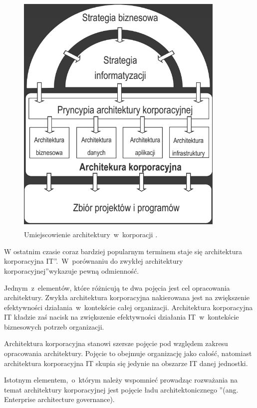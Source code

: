 \begin{figure}[h!tbp]
\begin{centering}
\includegraphics[width=10cm, height=12cm]{img/ea.png}
\caption[Umiejscowienie architektury~w~korporacji.]{Umiejscowienie architektury~w~korporacji \cite{SOMAArsIBMJour}.}\label{ea_arch}
\end{centering}
\end{figure}

W ostatnim czasie coraz bardziej popularnym terminem staje się \quotedblbase architektura korporacyjna IT\textquotedblright.~W~porównaniu do \quotedblbase zwykłej architektury korporacyjnej\textquotedblright wykazuje pewną odmienność.

Jednym~z~elementów, które różnicują te dwa pojęcia jest cel opracowania architektury. Zwykła architektura korporacyjna nakierowana jest na zwiększenie efektywności działania~w~kontekście całej organizacji. Architektura korporacyjna IT kładzie zaś nacisk na zwiększenie efektywności działania IT~w~kontekście biznesowych potrzeb organizacji. 

Architektura korporacyjna stanowi szersze pojęcie pod względem zakresu opracowania architektury. Pojęcie to obejmuje organizację jako całość, natomiast architektura korporacyjna IT skupia się jedynie na obszarze IT danej jednostki. 

Istotnym elementem,~o~którym należy wspomnieć prowadząc rozważania na temat architektury korporacyjnej jest pojęcie \quotedblbase ładu architektonicznego \textquotedblright (ang. Enterprise architecture governance). 

